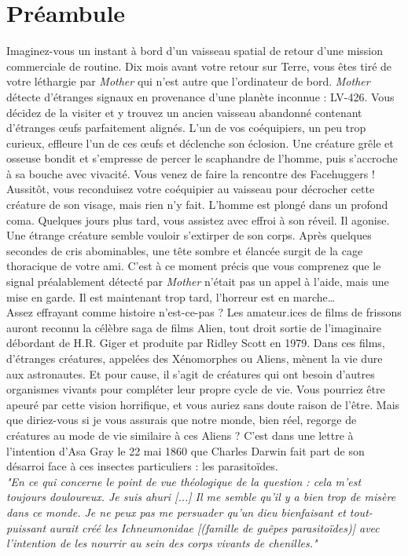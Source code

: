 \chapter*{Préambule}
Imaginez-vous un instant à bord d’un vaisseau spatial de retour d’une mission commerciale de routine. Dix mois avant votre retour sur Terre, vous êtes tiré de votre léthargie par \textit{Mother} qui n’est autre que l’ordinateur de bord. \textit{Mother} détecte d’étranges signaux en provenance d’une planète inconnue : LV-426. Vous décidez de la visiter et y trouvez un ancien vaisseau abandonné contenant d’étranges œufs parfaitement alignés. L’un de vos coéquipiers, un peu trop curieux, effleure l’un de ces œufs et déclenche son éclosion. Une créature grêle et osseuse bondit et s’empresse de percer le scaphandre de l’homme, puis s’accroche à sa bouche avec vivacité. Vous venez de faire la rencontre des Facehuggers ! Aussitôt, vous reconduisez votre coéquipier au vaisseau pour décrocher cette créature de son visage, mais rien n’y fait. L’homme est plongé dans un profond coma. Quelques jours plus tard, vous assistez avec effroi à son réveil. Il agonise. Une étrange créature semble vouloir s’extirper de son corps. Après quelques secondes de cris abominables, une tête sombre et élancée surgit de la cage thoracique de votre ami. C’est à ce moment précis que vous comprenez que le signal préalablement détecté par \textit{Mother} n’était pas un appel à l’aide, mais une mise en garde. Il est maintenant trop tard, l’horreur est en marche…\\

Assez effrayant comme histoire n'est-ce-pas ? Les amateur.ices de films de frissons auront reconnu la célèbre saga de films Alien, tout droit sortie de l’imaginaire débordant de H.R. Giger et produite par Ridley Scott en 1979. Dans ces films, d’étranges créatures, appelées des Xénomorphes ou Aliens, mènent la vie dure aux astronautes. Et pour cause, il s’agit de créatures qui ont besoin d’autres organismes vivants pour compléter leur propre cycle de vie. Vous pourriez être apeuré par cette vision horrifique, et vous auriez sans doute raison de l’être. Mais que diriez-vous si je vous assurais que notre monde, bien réel, regorge de créatures au mode de vie similaire à ces Aliens ? C'est dans une lettre à l'intention d'Asa Gray le 22 mai 1860 que Charles Darwin fait part de son désarroi face à ces insectes particuliers : les parasitoïdes. \\

\textit{"En ce qui concerne le point de vue théologique de la question : cela m'est toujours douloureux. Je suis ahuri [...] Il me semble qu'il y a bien trop de misère dans ce monde. Je ne peux pas me persuader qu'un dieu bienfaisant et tout-puissant aurait créé les Ichneumonidae [(famille de guêpes parasitoïdes)] avec l'intention de les nourrir au sein des corps vivants de chenilles."}\\

